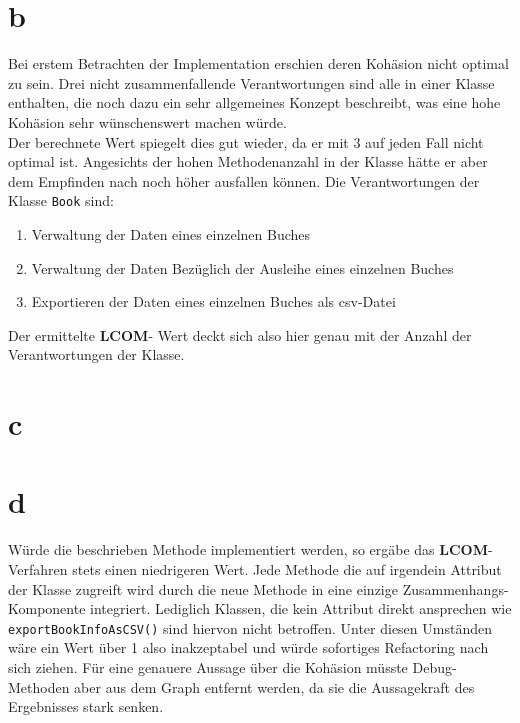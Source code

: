 \section*{b}
Bei erstem Betrachten der Implementation erschien deren Kohäsion nicht optimal zu sein. Drei nicht zusammenfallende Verantwortungen sind alle in einer Klasse enthalten, die noch dazu ein sehr allgemeines Konzept beschreibt, was eine hohe Kohäsion sehr wünschenswert machen würde.\\
Der berechnete Wert spiegelt dies gut wieder, da er mit 3 auf jeden Fall nicht optimal ist. Angesichts der hohen Methodenanzahl in der Klasse hätte er aber dem Empfinden nach noch höher ausfallen können.
Die Verantwortungen der Klasse \texttt{Book} sind:
\begin{enumerate}
	\item Verwaltung der Daten eines einzelnen Buches
	\item Verwaltung der Daten Bezüglich der Ausleihe eines einzelnen Buches
	\item Exportieren der Daten eines einzelnen Buches als csv-Datei
\end{enumerate}
 Der ermittelte \textbf{LCOM}- Wert deckt sich also hier genau mit der Anzahl der Verantwortungen der Klasse.
 
 
\section*{c}
\section*{d} 
Würde die beschrieben Methode implementiert werden, so ergäbe das \textbf{LCOM}-Verfahren stets einen niedrigeren Wert. Jede Methode die auf irgendein Attribut der Klasse zugreift wird durch die neue Methode in eine einzige Zusammenhangs-Komponente integriert.
Lediglich Klassen, die kein Attribut direkt ansprechen wie \texttt{exportBookInfoAsCSV()} sind hiervon nicht betroffen.
Unter diesen Umständen wäre ein Wert über 1 also inakzeptabel und würde sofortiges Refactoring nach sich ziehen. Für eine genauere Aussage über die Kohäsion müsste Debug-Methoden aber aus dem Graph entfernt werden, da sie die Aussagekraft des Ergebnisses stark senken. 